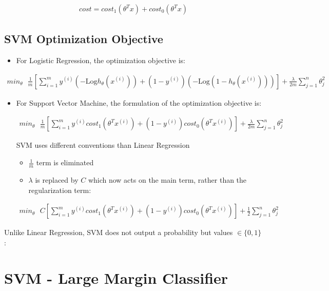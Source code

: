 \documentclass[a4paper,12pt]{report}
\begin{document}
\begin{align}
cost = cost_1(\theta^T x) + cost_0(\theta^T x)
\end{align}

\subsection{SVM Optimization Objective}
\begin{itemize}
\item For Logistic Regression, the optimization objective is:
\end{itemize}
\begin{align}
min_{\theta} \text{\ } \frac{1}{m} \left[ \sum_{i=1} ^m y^{(i)} \left( -\mathrm{Log} h_{\theta}(x^{(i)}) \right) + (1-y^{(i)}) \left( -\mathrm{Log} (1-h_{\theta}(x^{(i)})) \right) \right]  + \frac{\lambda}{2m} \sum_{j=1} ^n \theta_j ^2
\end{align}

\begin{itemize}
\item For Support Vector Machine, the formulation of the optimization objective is:

\begin{align}
min _{\theta}\text{\ } \frac{1}{m} \left[ \sum_{i=1} ^m y^{(i)} cost_1 (\theta^T x^{(i)}) + (1-y^{(i)}) cost_0( \theta^T x^{(i)})\right] + \frac{\lambda}{2m} \sum_{j=1} ^{n} \theta_j ^2 
\end{align}

SVM uses different conventions than Linear Regression
\begin{itemize}
\item $\frac{1}{m}$ term is eliminated
\item $\lambda$ is replaced by $C$ which now acts on the main term, rather than the regularization term: 
\end{itemize}
\begin{align}
min _{\theta}\text{\ } C \left[ \sum_{i=1} ^m y^{(i)} cost_1 (\theta^T x^{(i)}) + (1-y^{(i)}) cost_0( \theta^T x^{(i)})\right] + \frac{1}{2} \sum_{j=1} ^{n} \theta_j ^2
\end{align}
\end{itemize}
Unlike Linear Regression, SVM does not output a probability but values $\in \{0,1\}$:

\section{SVM - Large Margin Classifier}
\end{document}
